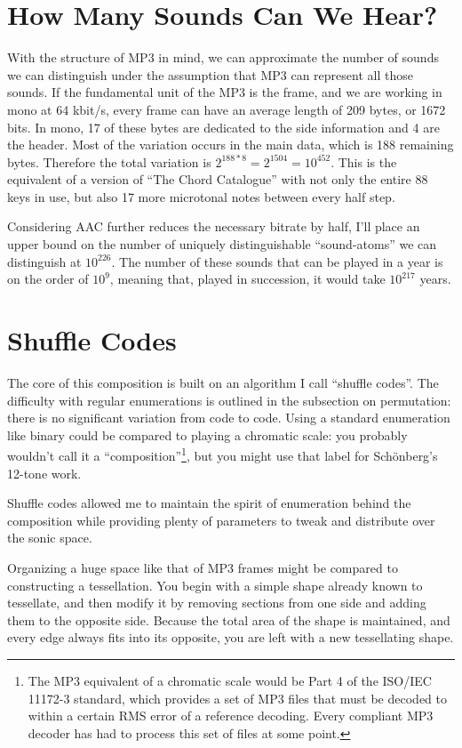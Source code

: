 \documentclass{thesis}
\begin{document}
\section{How Many Sounds Can We Hear?}

With the structure of MP3 in mind, we can approximate the number of sounds we can distinguish under the assumption that MP3 can represent all those sounds. If the fundamental unit of the MP3 is the frame, and we are working in mono at 64 kbit/s, every frame can have an average length of 209 bytes, or 1672 bits. In mono, 17 of these bytes are dedicated to the side information and 4 are the header. Most of the variation occurs in the main data, which is 188 remaining bytes. Therefore the total variation is $2^{188*8}=2^{1504}=10^{452}$. This is the equivalent of a version of ``The Chord Catalogue'' with not only the entire 88 keys in use, but also 17 more microtonal notes between every half step.

Considering AAC further reduces the necessary bitrate by half, I'll place an upper bound on the number of uniquely distinguishable ``sound-atoms'' we can distinguish at $10^{226}$. The number of these sounds that can be played in a year is on the order of $10^9$, meaning that, played in succession, it would take $10^{217}$ years.
	
\section{Shuffle Codes}

The core of this composition is built on an algorithm I call ``shuffle codes''. The difficulty with regular enumerations is outlined in the subsection on permutation: there is no significant variation from code to code. Using a standard enumeration like binary could be compared to playing a chromatic scale: you probably wouldn't call it a ``composition''\footnote{The MP3 equivalent of a chromatic scale would be Part 4 of the ISO/IEC 11172-3 standard, which provides a set of MP3 files that must be decoded to within a certain RMS error of a reference decoding. Every compliant MP3 decoder has had to process this set of files at some point.}, but you might use that label for Sch\"onberg's 12-tone work.

Shuffle codes allowed me to maintain the spirit of enumeration behind the composition while providing plenty of parameters to tweak and distribute over the sonic space.

Organizing a huge space like that of MP3 frames might be compared to constructing a tessellation. You begin with a simple shape already known to tessellate, and then modify it by removing sections from one side and adding them to the opposite side. Because the total area of the shape is maintained, and every edge always fits into its opposite, you are left with a new tessellating shape.
\end{document}
